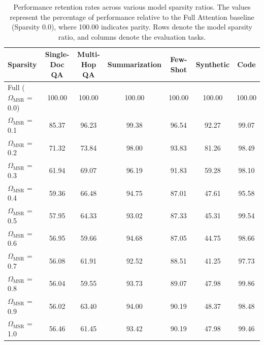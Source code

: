 \begin{table}[t]
\centering
\caption{Performance retention rates across various model sparsity ratios. The values represent the percentage of performance relative to the Full Attention baseline (Sparsity 0.0), where 100.00 indicates parity. Rows denote the model sparsity ratio, and columns denote the evaluation tasks.}
\label{tab:sparsity_performance_matrix}
\begin{small}
\begin{tabular}{l|cccccc}
\toprule
\textbf{Sparsity} & \textbf{Single-Doc QA} & \textbf{Multi-Hop QA} & \textbf{Summarization} & \textbf{Few-Shot} & \textbf{Synthetic} & \textbf{Code} \\
\midrule
Full ($\Omega_{\mathrm{MSR}}$ = 0.0) & 100.00 & 100.00 & 100.00 & 100.00 & 100.00 & 100.00 \\
\midrule
$\Omega_{\mathrm{MSR}}$ = 0.1 & 85.37 & 96.23 & 99.38 & 96.54 & 92.27 & 99.07 \\
$\Omega_{\mathrm{MSR}}$ = 0.2 & 71.32 & 73.84 & 98.00 & 93.83 & 81.26 & 98.49 \\
$\Omega_{\mathrm{MSR}}$ = 0.3 & 61.94 & 69.07 & 96.19 & 91.83 & 59.28 & 98.10 \\
$\Omega_{\mathrm{MSR}}$ = 0.4 & 59.36 & 66.48 & 94.75 & 87.01 & 47.61 & 95.58 \\
$\Omega_{\mathrm{MSR}}$ = 0.5 & 57.95 & 64.33 & 93.02 & 87.33 & 45.31 & 99.54 \\
$\Omega_{\mathrm{MSR}}$ = 0.6 & 56.95 & 59.66 & 94.68 & 87.05 & 44.75 & 98.66 \\
$\Omega_{\mathrm{MSR}}$ = 0.7 & 56.08 & 61.91 & 92.52 & 88.51 & 41.25 & 97.73 \\
$\Omega_{\mathrm{MSR}}$ = 0.8 & 56.04 & 59.55 & 93.73 & 89.07 & 47.98 & 99.86 \\
$\Omega_{\mathrm{MSR}}$ = 0.9 & 56.02 & 63.40 & 94.00 & 90.19 & 48.37 & 98.48 \\
$\Omega_{\mathrm{MSR}}$ = 1.0 & 56.46 & 61.45 & 93.42 & 90.19 & 47.98 & 99.46 \\
\bottomrule
\end{tabular}
\end{small}
\end{table}